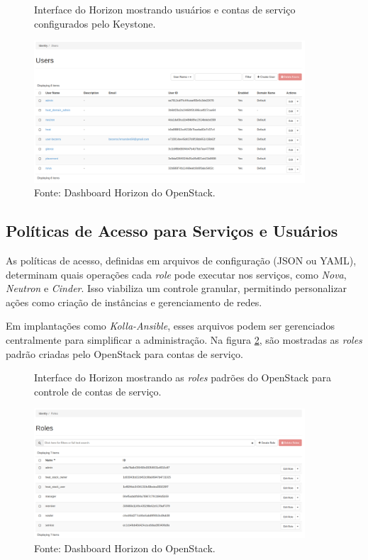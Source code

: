 \begin{figure}[htbp]
    \centering
    \caption{Interface do Horizon mostrando usuários e contas de serviço configurados pelo Keystone.}
    \includegraphics[width=0.9\textwidth]{images/openstack_users.png}
    \caption*{Fonte: Dashboard Horizon do OpenStack.}
    \label{fig:openstack_users}
\end{figure}

\subsection{Políticas de Acesso para Serviços e Usuários}
As políticas de acesso, definidas em arquivos de configuração (JSON ou YAML), determinam quais operações cada \textit{role} pode executar nos serviços, como \textit{Nova}, \textit{Neutron} e \textit{Cinder}. Isso viabiliza um controle granular, permitindo personalizar ações como criação de instâncias e gerenciamento de redes.

Em implantações como \textit{Kolla-Ansible}, esses arquivos podem ser gerenciados centralmente para simplificar a administração. Na figura \ref{fig:openstack_roles}, são mostradas as \textit{roles} padrão criadas pelo OpenStack para contas de serviço.

\begin{figure}[htbp]
    \centering
    \caption{Interface do Horizon mostrando as \textit{roles} padrões do OpenStack para controle de contas de serviço.}
    \includegraphics[width=0.9\textwidth]{images/openstack_roles.png}
    \caption*{Fonte: Dashboard Horizon do OpenStack.}
    \label{fig:openstack_roles}
\end{figure}

